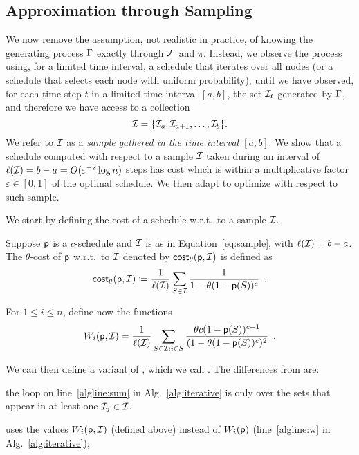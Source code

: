 \subsection{Approximation through Sampling}\label{sec:sampcomp}
We now remove the assumption, not realistic in practice, of knowing the
generating process $\Gamma$ exactly through $\mathcal{F}$ and $\pi$. Instead, we
observe the process using, for a limited time interval, a schedule that iterates
over all nodes (or a schedule that selects each node with uniform probability),
until we have observed, for each time step $t$ in a limited time interval
$[a,b]$, the set $\mathcal{I}_t$ generated by $\Gamma$, and therefore we have access
to a collection
\begin{equation}\label{eq:sample}
	\mathcal{I}=\{\mathcal{I}_a,\mathcal{I}_{a+1},\dotsc,\mathcal{I}_b\}.
\end{equation}
We refer to $\mathcal{I}$ as a \emph{sample gathered in the time interval
$[a,b]$}. We show that a schedule computed with respect to a sample $\mathcal{I}$ taken during an interval of
$ \ell (\mathcal{I}) = b-a=O(\varepsilon^{-2}\log n)$ steps has cost which is within  a
multiplicative factor $\varepsilon\in[0,1]$ of the optimal schedule. We then adapt \algoname to optimize with respect to such sample.


We start by defining the cost of a schedule w.r.t.~to a sample $\mathcal{I}$.

\begin{definition}\label{def:costsample}
	Suppose $\mathsf{p}$ is a $c$-schedule and $\mathcal{I}$ is as in Equation~\eqref{eq:sample},
	with $\ell (\mathcal{I}) = b-a$. The $\theta$-cost of $\mathsf{p}$ w.r.t.~to $\mathcal{I}$
	denoted by $\mathsf{cost}_\theta(\mathsf{p},\mathcal{I})$ is defined as
	\[
		\mathsf{cost}_\theta(\mathsf{p},\mathcal{I})\coloneqq\frac{1}{\ell(\mathcal{I})}\sum_{S\in \mathcal{I}}
		\frac{1}{1-\theta(1-\mathsf{p}(S))^c}\enspace.
	\]
\end{definition}

For $1\le i\le n$, define now the functions
\[
	W_i(\mathsf{p},\mathcal{I}) = \frac{1}{\ell(\mathcal{I})}\sum_{S\in \mathcal{I}: i\in S}
	\frac{\theta c (1-\mathsf{p}(S))^{c-1}}{(1-\theta(1-\mathsf{p}(S))^c)^2}\enspace.
\]

We can then define a variant of \algoname, which we call \algonameapx. The
differences from \algoname are:
\begin{enumerate*}
	\item the loop on line~\ref{algline:sum} in Alg.~\ref{alg:iterative} is only
		over the sets that appear in at least one $\mathcal{I}_j\in\mathcal{I}$.
	\item \algonameapx uses the values $W_i(\mathsf{p},\mathcal{I})$ (defined above) instead of
		$W_i(\mathsf{p})$ (line~\ref{algline:w} in Alg.~\ref{alg:iterative});
\end{enumerate*}

